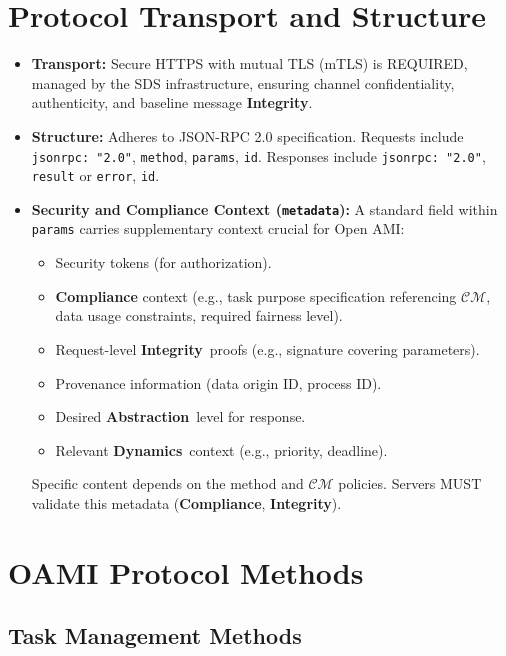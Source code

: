 \documentclass[12pt,a4paper]{report}
\newcommand{\Integrity}{\textbf{Integrity}}
\newcommand{\Abstraction}{\textbf{Abstraction}}
\newcommand{\Dynamics}{\textbf{Dynamics}}
\begin{document}
	\section{Protocol Transport and Structure}
	\label{app:oami_transport_structure}
	
	\begin{itemize}
		\item \textbf{Transport:} Secure HTTPS with mutual TLS (mTLS) is REQUIRED, managed by the SDS infrastructure, ensuring channel confidentiality, authenticity, and baseline message \Integrity.
		\item \textbf{Structure:} Adheres to JSON-RPC 2.0 specification. Requests include \texttt{jsonrpc: "2.0"}, \texttt{method}, \texttt{params}, \texttt{id}. Responses include \texttt{jsonrpc: "2.0"}, \texttt{result} or \texttt{error}, \texttt{id}.
		\item \textbf{Security and Compliance Context (\texttt{metadata}):} A standard field within \texttt{params} carries supplementary context crucial for Open AMI:
		\begin{itemize}
			\item Security tokens (for authorization).
			\item \textbf{Compliance} context (e.g., task purpose specification referencing $\mathcal{CM}$, data usage constraints, required fairness level).
			\item Request-level \Integrity\ proofs (e.g., signature covering parameters).
			\item Provenance information (data origin ID, process ID).
			\item Desired \Abstraction\ level for response.
			\item Relevant \Dynamics\ context (e.g., priority, deadline).
		\end{itemize}
		Specific content depends on the method and $\mathcal{CM}$ policies. Servers MUST validate this metadata (\textbf{Compliance}, \Integrity).
	\end{itemize}
	
	\section{OAMI Protocol Methods}
	\label{app:oami_methods}
	
	\subsection{Task Management Methods}
	\label{app:oami_task_mgmt}
	
\end{document}
